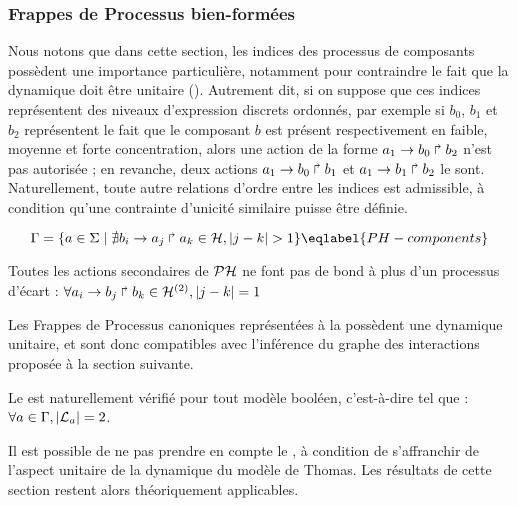 \subsubsection{Frappes de Processus bien-formées}

Nous notons que dans cette section, les indices des processus de composants
possèdent une importance particulière,
notamment pour contraindre le fait que la dynamique doit être unitaire ().
Autrement dit, si on suppose que ces indices représentent des niveaux d'expression discrets
ordonnés,
par exemple si $b_0$, $b_1$ et $b_2$ représentent le fait que le composant $b$
est présent respectivement en faible, moyenne et forte concentration,
alors une action de la forme $a_1\rightarrow b_0\Rsh b_2$ n'est pas autorisée ;
en revanche, deux actions $a_1\rightarrow b_0\Rsh b_1$ et $a_1\rightarrow b_1\Rsh b_2$ le sont.
Naturellement, toute autre relations d'ordre entre les indices est admissible,
à condition qu'une contrainte d'unicité similaire puisse être définie.

\begin{equation}
\components = \{a \in \PHs \mid \nexists \PHfrappe{b_i}{a_j}{a_k} \in \PHa, |j - k| > 1\} \\
\eqlabel{PH-components}
\end{equation}

\begin{critere}
  Toutes les actions secondaires de $\mathcal{PH}$ ne font pas de bond
  à plus d'un processus d'écart :
  $\forall a_i\rightarrow b_j\Rsh b_k \in \mathcal{H}^{(2)}, |j - k| = 1$
\end{critere}

\begin{example}
  Les Frappes de Processus canoniques représentées à la 
  possèdent une dynamique unitaire, et sont donc compatibles
  avec l'inférence du graphe des interactions proposée à la section suivante.
\end{example}

\begin{remark}
  Le  est naturellement vérifié pour tout modèle booléen,
  c'est-à-dire tel que : $\forall a \in \mathrm{\Gamma}, |\mathcal{L}_a| = 2$.
\end{remark}

\begin{remark}
  Il est possible de ne pas prendre en compte le ,
  à condition de s'affranchir de l'aspect unitaire de la dynamique du modèle de Thomas.
  Les résultats de cette section restent alors théoriquement applicables.
\end{remark}

